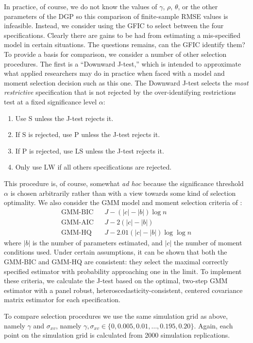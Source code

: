 In practice, of course, we do not know the values of $\gamma$, $\rho$, $\theta$, or the other parameters of the DGP so this comparison of finite-sample RMSE values is infeasible.
Instead, we consider using the GFIC to select between the four specifications.
Clearly there are gains to be had from estimating a mis-specified model in certain situations.
The questions remains, can the GFIC identify them?
To provide a basis for comparison, we consider a number of other selection procedures. 
The first is a ``Downward J-test,'' which is intended to approximate what applied researchers may do in practice when faced with a model and moment selection decision such as this one.
The Downward J-test selects the \emph{most restrictive} specification that is not rejected by the over-identifying restrictions test at a fixed significance level $\alpha$:
\begin{enumerate}
\item Use $\text{S}$ unless the J-test rejects it. 
\item If $\text{S}$ is rejected, use $\text{P}$ unless the J-test rejects it. 
\item If $\text{P}$ is rejected, use $\text{LS}$ unless the J-test rejects it. 
\item Only use $\text{LW}$ if all others specifications are rejected.
\end{enumerate}
This procedure is, of course, somewhat \emph{ad hoc} because the significance threshold $\alpha$ is chosen arbitrarily rather than with a view towards some kind of selection optimality. 
We also consider the GMM model and moment selection criteria of \cite{AndrewsLu}: 
	\begin{eqnarray*}
	 \mbox{GMM-BIC} && J - (|c| - |b|) \log{n}\\
	 \mbox{GMM-AIC}&& J - 2(|c| - |b|)\\ 
	 \mbox{GMM-HQ} && J - 2.01 (|c| - |b|)  \log{\log{n}}
	\end{eqnarray*}
where $|b|$ is the number of parameters estimated, and $|c|$ the number of moment conditions used. 
Under certain assumptions, it can be shown that both the GMM-BIC and GMM-HQ are consistent: they select the maximal correctly specified estimator with probability approaching one in the limit. 
To implement these criteria, we calculate the J-test based on the optimal, two-step GMM estimator with a panel robust, heteroscedasticity-consistent, centered covariance matrix estimator for each specification.

To compare selection procedures we use the same simulation grid as above, namely $\gamma$ and $\sigma_{xv}$, namely $\gamma, \sigma_{xv} \in \{0, 0.005, 0.01, \hdots, 0.195, 0.20\}$.  
Again, each point on the simulation grid is calculated from 2000 simulation replications. 

